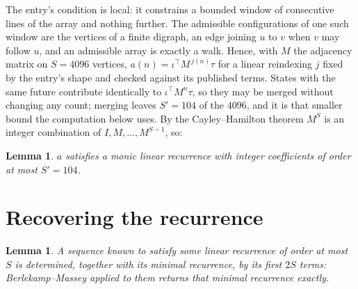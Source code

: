 \documentclass[11pt,a4paper]{article}
\theoremstyle{plain}
\newtheorem{lemma}[theorem]{Lemma}
\theoremstyle{definition}
\begin{document}
The entry's condition is local: it constrains a bounded window of consecutive lines of the
array and nothing further. The admissible configurations of one such window are the vertices
of a finite digraph, an edge joining $u$ to $v$ when $v$ may follow $u$, and an admissible
array is exactly a walk. Hence, with $M$ the adjacency matrix on $S=4096$ vertices,
$a(n)=\iota^{\!\top}M^{\,j(n)}\tau$ for a linear reindexing $j$ fixed by the entry's shape
and checked against its published terms. States with the same future contribute identically to $\iota^{\!\top}M^n\tau$, so they may be merged without changing any count; merging leaves $S'=104$ of the $4096$, and it is that smaller bound the computation below uses. By the Cayley--Hamilton theorem $M^{S}$ is an
integer combination of $I,M,\dots,M^{S-1}$, so:

\begin{lemma}\label{lem:cf}
$a$ satisfies a monic linear recurrence with integer coefficients of order at most
$S'=104$.
\end{lemma}

\section{Recovering the recurrence}

\begin{lemma}\label{lem:bm}
A sequence known to satisfy some linear recurrence of order at most $S$ is determined, together
with its minimal recurrence, by its first $2S$ terms: Berlekamp--Massey applied to them returns
that minimal recurrence exactly.
\end{lemma}
\end{document}
